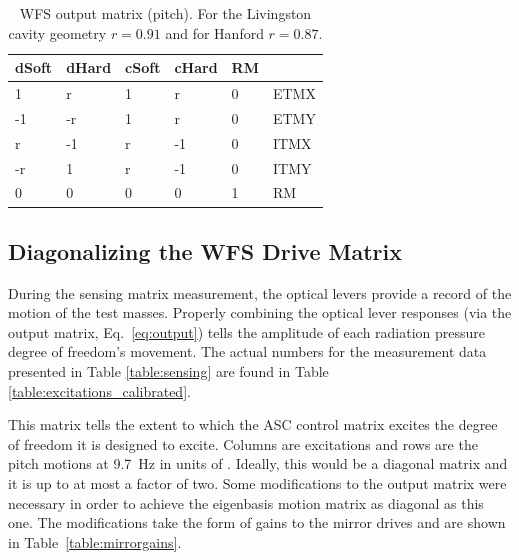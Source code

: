 \begin{table}
\centering
\caption[WFS output matrix]{WFS output matrix (pitch). For the Livingston cavity geometry
  $r=0.91$ and for Hanford $r=0.87$.}
\begin{tabular}{l l l l l l}
\hline 
dSoft & dHard & cSoft & cHard & RM & \\
\hline 
1 & r & 1 & r & 0 & ETMX\\
-1 & -r & 1 & r & 0 & ETMY \\
r & -1 & r & -1 & 0 & ITMX\\
-r & 1 & r & -1 & 0 & ITMY\\
 0 & 0 & 0 & 0 & 1 & RM\\
\hline
\end{tabular}
\label{table:output}
\end{table}


\subsection{Diagonalizing the WFS Drive Matrix}

During the sensing matrix measurement, the optical levers provide a
record of the motion of the test masses. Properly combining the
optical lever responses (via the output matrix, Eq.~\ref{eq:output})
tells the amplitude of each radiation pressure degree of freedom's
movement. The actual numbers for the measurement data presented in
Table \ref{table:sensing} are found in Table
\ref{table:excitations_calibrated}.

This matrix tells the extent to which the ASC control matrix excites
the degree of freedom it is designed to excite. Columns are
excitations and rows are the pitch motions at 9.7~Hz in units of
\microrad. Ideally, this would be a diagonal matrix and it is up to at
most a factor of two. Some modifications to the output matrix were
necessary in order to achieve the eigenbasis motion matrix as diagonal
as this one. The modifications take the form of gains to the mirror
drives and are shown in Table~\ref{table:mirrorgains}.





